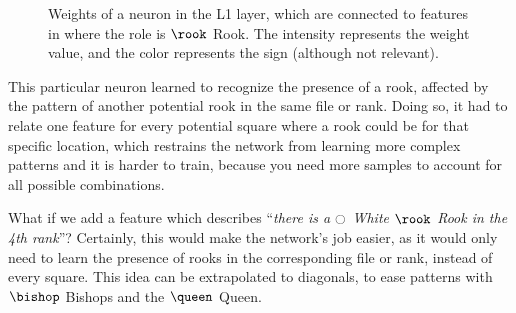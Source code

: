 \begin{figure}[h]
\centering
{}%
\qquad
{}%
\caption{Weights of a neuron in the L1 layer, which are connected to features in  where the role is $\rook$ Rook. The intensity represents the weight value, and the color represents the sign (although not relevant).}
\label{fig:rook_weights}
\end{figure}

This particular neuron learned to recognize the presence of a rook, affected by the pattern of another potential rook in the same file or rank. Doing so, it had to relate one feature for every potential square where a rook could be for that specific location, which restrains the network from learning more complex patterns and it is harder to train, because you need more samples to account for all possible combinations.

What if we add a feature which describes \enquote{\textit{there is a $\white$ White $\rook$ Rook in the 4th rank}}? Certainly, this would make the network's job easier, as it would only need to learn the presence of rooks in the corresponding file or rank, instead of every square. This idea can be extrapolated to diagonals, to ease patterns with $\bishop$ Bishops and the $\queen$ Queen.

